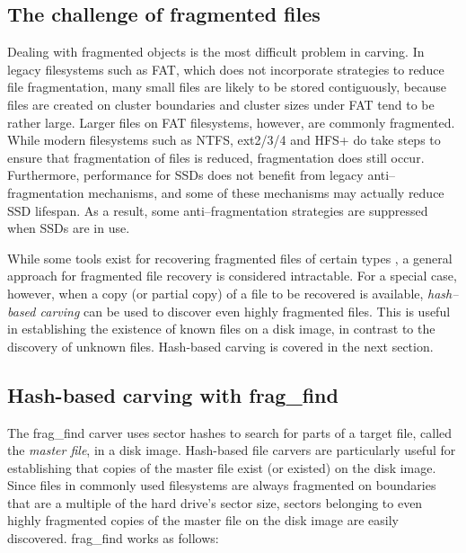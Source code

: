 \subsection{The challenge of fragmented files}

Dealing with fragmented objects is the most difficult problem in
carving.  In legacy filesystems such as FAT, which does not
incorporate strategies to reduce file fragmentation, many small files
are likely to be stored contiguously, because files are created on
cluster boundaries and cluster sizes under FAT tend to be rather
large.  Larger files on FAT filesystems, however, are commonly
fragmented\cite{dfrws2007:SimsonLGarfinkel}.  While modern filesystems
such as NTFS, ext2/3/4 and HFS+ do take steps to ensure that
fragmentation of files is reduced, fragmentation does still occur.
Furthermore, performance for SSDs does not benefit from legacy
anti--fragmentation mechanisms, and some of these mechanisms may
actually reduce SSD lifespan.  As a result, some anti--fragmentation
strategies are suppressed when SSDs are in use.  

While some tools
exist for recovering fragmented files of certain types \cite{adroit},
a general approach for fragmented file recovery is considered intractable.
For a special case, however, when a copy (or partial copy) of a file to be
recovered is available, \emph{hash--based carving} can be used to discover
even highly fragmented files.  This is useful in establishing the existence
of known files on a disk image, in contrast to the discovery of unknown
files.  Hash-based carving is covered in the next section.

\subsection{Hash-based carving with frag\_find}

The frag\_find carver uses sector hashes to search for parts of a target file, called the \emph{master file}, in a disk image. Hash-based file carvers are particularly useful for establishing that copies of the master file exist (or existed) on the disk image.  Since files in commonly used filesystems are always fragmented on boundaries that are a multiple of the hard drive's sector size, sectors belonging to even highly fragmented copies of the master file on the disk image are easily discovered.  frag\_find works as follows:

